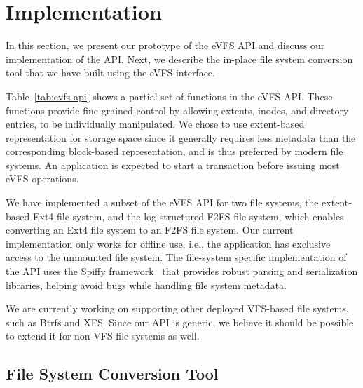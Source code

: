 \vspace{-0.7em}
\section{Implementation\label{sec:Implementation}}
\vspace{-0.4em}

In this section, we present our prototype of the eVFS API and discuss our implementation of the API. Next, we describe the in-place file system conversion tool that we have built using the eVFS interface.

Table~\ref{tab:evfs-api} shows a partial set of functions in the eVFS API. These functions provide fine-grained control by allowing extents, inodes, and directory entries, to be individually manipulated. We chose to use extent-based representation for storage space since it generally requires less metadata than the corresponding block-based representation, and is thus preferred by modern file systems. An application is expected to start a transaction before issuing most eVFS operations. 


We have implemented a subset of the eVFS API for two file systems, the extent-based Ext4 file system, and the log-structured F2FS file system, which enables converting an Ext4 file system to an F2FS file system. Our current implementation only works for offline use, i.e., the application has exclusive access to the unmounted file system. The file-system specific implementation of the API uses the Spiffy framework~\cite{sun2018spiffy} that provides robust parsing and serialization libraries, helping avoid bugs while handling file system metadata.

We are currently working on supporting other deployed VFS-based file systems, such as Btrfs and XFS. Since our API is generic, we believe it should be possible to extend it for non-VFS file systems as well.

\vspace{-0.4em}
\subsection{File System Conversion Tool\label{subsec:conversion_tool}}
\vspace{-0.1em}

